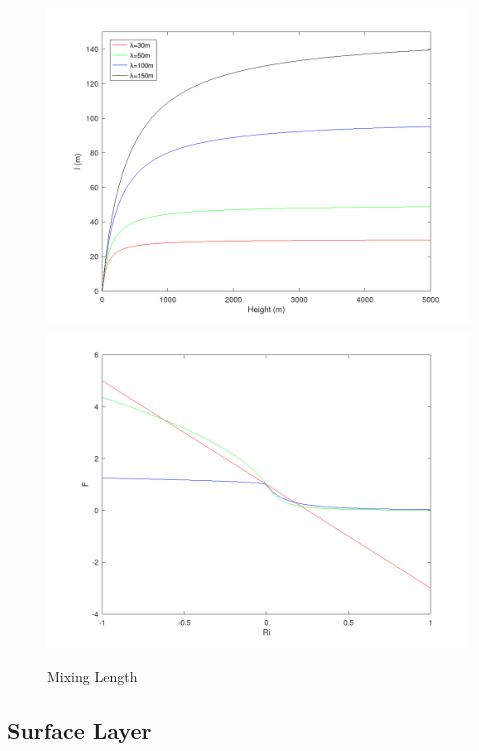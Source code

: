 \begin{figure}[htbp]\vspace*{0cm}\hspace*{0cm}
\includegraphics[angle=0,scale=0.2]{Figures/Apx_VarDiff/Kz_MixLen.png}
\includegraphics[angle=0,scale=0.2]{Figures/Apx_VarDiff/Kz_Fc.png}\\
\parbox{15cm}{\caption{\label{FigVarDiff_Kz_MixLen}
Mixing Length
}}
\end{figure}


\subsection{Surface Layer}

